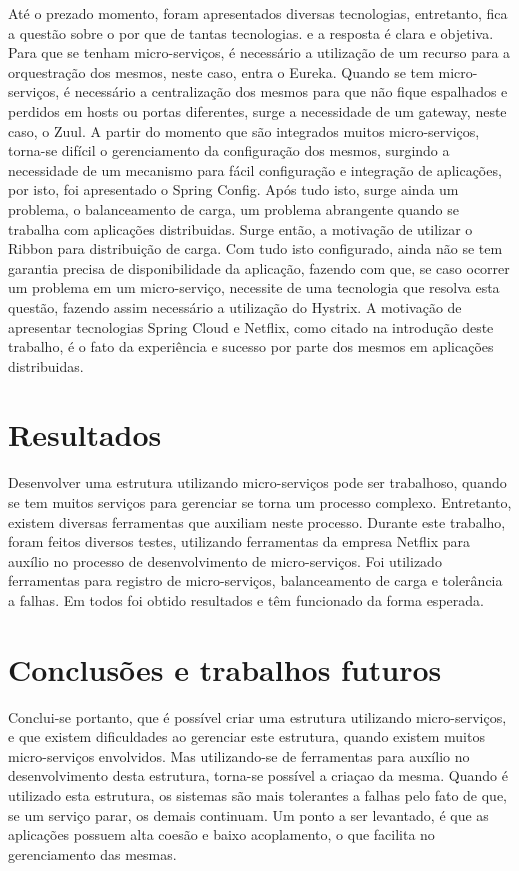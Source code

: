 \documentclass[journal]{IEEEtran}
\begin{document}
Até o prezado momento, foram apresentados diversas tecnologias, entretanto, fica a questão sobre o por que de tantas tecnologias. e a resposta é clara e objetiva. Para que se tenham micro-serviços, é necessário a utilização de um recurso para a orquestração dos mesmos, neste caso, entra o Eureka. Quando se tem micro-serviços, é necessário a centralização dos mesmos para que não fique espalhados e perdidos em hosts ou portas diferentes, surge a necessidade de um gateway, neste caso, o Zuul. A partir do momento que são integrados muitos micro-serviços, torna-se difícil o gerenciamento da configuração dos mesmos, surgindo a necessidade de um mecanismo para fácil configuração e integração de aplicações, por isto, foi apresentado o Spring Config. Após tudo isto, surge ainda um problema, o balanceamento de carga, um problema abrangente quando se trabalha com aplicações distribuidas. Surge então, a motivação de utilizar o Ribbon para distribuição de carga. Com tudo isto configurado, ainda não se tem garantia precisa de disponibilidade da aplicação, fazendo com que, se caso ocorrer um problema em um micro-serviço, necessite de uma tecnologia que resolva esta questão, fazendo assim necessário a utilização do Hystrix. A motivação de apresentar tecnologias Spring Cloud e Netflix, como citado na introdução deste trabalho, é o fato da experiência e sucesso por parte dos mesmos em aplicações distribuidas.


\section{Resultados}

Desenvolver uma estrutura utilizando micro-serviços pode ser trabalhoso, quando se tem muitos serviços para gerenciar se torna um processo complexo. Entretanto, existem diversas ferramentas que auxiliam neste processo. Durante este trabalho, foram feitos diversos testes, utilizando ferramentas da empresa Netflix para auxílio no processo de desenvolvimento de micro-serviços. Foi utilizado ferramentas para registro de micro-serviços, balanceamento de carga e tolerância a falhas. Em todos foi obtido resultados e têm funcionado da forma esperada.

\section{Conclusões e trabalhos futuros}

Conclui-se portanto, que é possível criar uma estrutura utilizando micro-serviços, e que existem dificuldades ao gerenciar este estrutura, quando existem muitos micro-serviços envolvidos. Mas utilizando-se de ferramentas para auxílio no desenvolvimento desta estrutura, torna-se possível a criaçao da mesma. Quando é utilizado esta estrutura, os sistemas são mais tolerantes a falhas pelo fato de que, se um serviço parar, os demais continuam. Um ponto a ser levantado, é que as aplicações possuem alta coesão e baixo acoplamento, o que facilita no gerenciamento das mesmas.
\end{document}

